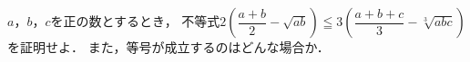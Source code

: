 \documentclass[../../main.tex]{subfiles}
\begin{document}
$a$，$b$，$c$を正の数とするとき，
不等式$\displaystyle 2 \left( \dfrac{a+b}{2}-\sqrt{ab} \right) \leqq 3 \left( \dfrac{a+b+c}{3}-\sqrt[3]{abc} \right) $
を証明せよ．
また，等号が成立するのはどんな場合か．
\end{document}
